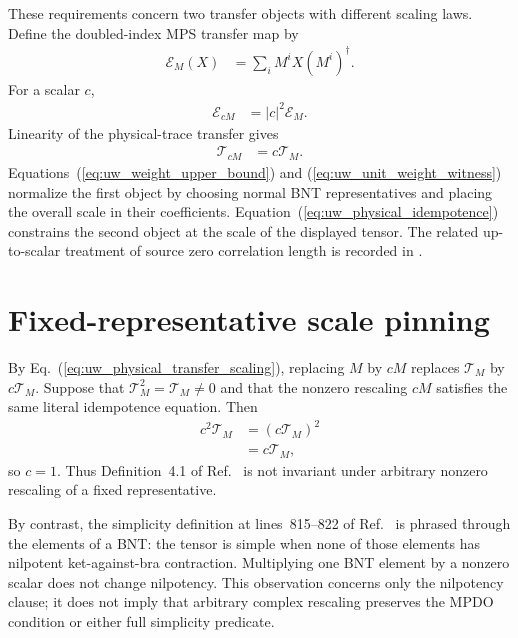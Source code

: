 \documentclass{article}
\begin{document}
These requirements concern two transfer objects with different scaling laws.
Define the doubled-index MPS transfer map by
\begin{align}
    \mathcal E_M(X)
    &=\sum_i M^iX(M^i)^\dagger.
    \label{eq:uw_mps_transfer_definition}
\end{align}
For a scalar $c$,
\begin{align}
    \mathcal E_{cM}
    &=|c|^2\mathcal E_M.
    \label{eq:uw_mps_transfer_scaling}
\end{align}
Linearity of the physical-trace transfer gives
\begin{align}
    \mathcal T_{cM}
    &=c\mathcal T_M.
    \label{eq:uw_physical_transfer_scaling}
\end{align}
Equations~(\ref{eq:uw_weight_upper_bound}) and
(\ref{eq:uw_unit_weight_witness}) normalize the first object by choosing normal
BNT representatives and placing the overall scale in their coefficients.
Equation~(\ref{eq:uw_physical_idempotence}) constrains the second object at the
scale of the displayed tensor. The related up-to-scalar treatment of source
zero correlation length is recorded in
.

\section{Fixed-representative scale pinning}

By Eq.~(\ref{eq:uw_physical_transfer_scaling}), replacing $M$ by $cM$ replaces
$\mathcal T_M$ by $c\mathcal T_M$. Suppose that
$\mathcal T_M^2=\mathcal T_M\ne0$ and that the nonzero rescaling $cM$ satisfies
the same literal idempotence equation. Then
\begin{align}
    c^2\mathcal T_M
    &=(c\mathcal T_M)^2
    \label{eq:uw_rescaled_transfer_square}\\
    &=c\mathcal T_M,
    \label{eq:uw_rescaled_idempotence}
\end{align}
so $c=1$. Thus Definition~4.1 of
Ref.~\cite{Cirac2016MPDO_arXiv} is not invariant under arbitrary nonzero
rescaling of a fixed representative.

By contrast, the simplicity definition at lines~815--822 of
Ref.~\cite{Cirac2016MPDO_arXiv} is phrased through the elements of a BNT: the
tensor is simple when none of those elements has nilpotent ket-against-bra
contraction. Multiplying one BNT element by a nonzero scalar does not change
nilpotency. This observation concerns only the nilpotency clause; it does not
imply that arbitrary complex rescaling preserves the MPDO condition or either
full simplicity predicate.
\end{document}
